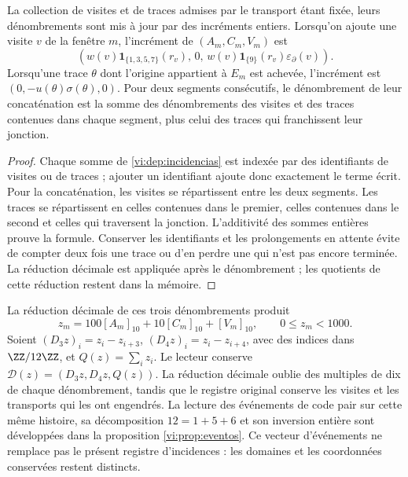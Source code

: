 \begin{proposition}
\label{vi:dep:libro-actualizacion}
La collection de visites et de traces admises par le transport étant fixée, leurs
dénombrements sont mis à jour par des incréments entiers. Lorsqu’on ajoute une
visite \(v\) de la fenêtre \(m\), l’incrément de \((A_m,C_m,V_m)\) est
\[
 \left(w(v)\mathbf1_{\{1,3,5,7\}}(r_v),\,0,\,
 w(v)\mathbf1_{\{9\}}(r_v)\varepsilon_\partial(v)\right).
\]
Lorsqu’une trace \(\theta\) dont l’origine appartient à \(E_m\) est achevée,
l’incrément est \((0,-u(\theta)\sigma(\theta),0)\).
Pour deux segments consécutifs, le dénombrement de leur concaténation est
la somme des dénombrements des visites et des traces contenues dans chaque
segment, plus celui des traces qui franchissent leur jonction.
\end{proposition}
\begin{proof}
Chaque somme de \eqref{vi:dep:incidencias} est indexée par des identifiants
de visites ou de traces ; ajouter un identifiant ajoute donc
exactement le terme écrit. Pour la concaténation, les visites
se répartissent entre les deux segments. Les traces se répartissent en
celles contenues dans le premier, celles contenues dans le second et celles
qui traversent la jonction. L’additivité des sommes entières prouve
la formule. Conserver les identifiants et les prolongements
en attente évite de compter deux fois une trace ou d’en perdre une qui
n’est pas encore terminée. La réduction décimale est appliquée après le
dénombrement ; les quotients de cette réduction restent dans la mémoire.
\end{proof}

La réduction décimale de ces trois dénombrements produit
\begin{equation}
 z_m=100[A_m]_{10}+10[C_m]_{10}+[V_m]_{10},
 \qquad 0\le z_m<1000.
 \label{vi:dep:bloque-incidencial}
\end{equation}
Soient \((D_3z)_i=z_i-z_{i+3}\),
\((D_4z)_i=z_i-z_{i+4}\), avec des indices dans \(\ZZ/12\ZZ\), et
\(Q(z)=\sum_i z_i\). Le lecteur conserve
\(\mathcal D(z)=(D_3z,D_4z,Q(z))\). La réduction décimale oublie des
multiples de dix de chaque dénombrement, tandis que le registre original conserve
les visites et les transports qui les ont engendrés.
La lecture des événements de code pair sur cette même histoire,
sa décomposition \(12=1+5+6\) et son inversion entière sont
développées dans la proposition \ref{vi:prop:eventos}. Ce vecteur
d’événements ne remplace pas le présent registre d’incidences :
les domaines et les coordonnées conservées restent distincts.

